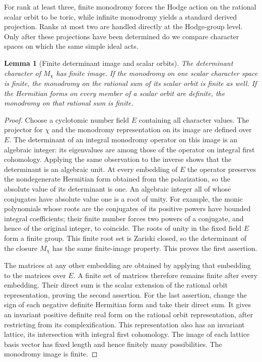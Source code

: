 \documentclass[11pt]{article}
\theoremstyle{plain}
\newtheorem{lemma}[theorem]{Lemma}
\theoremstyle{definition}
\theoremstyle{remark}
\numberwithin{equation}{section}
\begin{document}
For rank at least three, finite monodromy forces the Hodge action on the
rational scalar orbit to be toric, while infinite monodromy yields a
standard derived projection.  Ranks at most two are handled directly at the
Hodge-group level.  Only after these projections have been determined
do we compare character spaces on which the same simple ideal acts.

\begin{lemma}[Finite determinant image and scalar orbits]\label{p4:sphere-determinant-finite}
The determinant character of $M_\chi$ has finite image.  If the
monodromy on one scalar character space is finite, the monodromy on
the rational sum of its scalar orbit is finite as well.
If the Hermitian forms on every member of a scalar orbit are definite,
the monodromy on that rational sum is finite.
\end{lemma}

\begin{proof}
Choose a cyclotomic number field $E$ containing all character values.
The projector for $\chi$ and the monodromy representation on its image
are defined over $E$.  The determinant of an integral monodromy
operator on this image is an algebraic integer: its eigenvalues are
among those of the operator on integral first cohomology.  Applying
the same observation to the inverse shows that the determinant is an
algebraic unit.  At every embedding of $E$ the operator preserves the
nondegenerate Hermitian form obtained from the polarization, so the
absolute value of its determinant is one.  An algebraic integer all
of whose conjugates have absolute value one is a root of unity.
For example, the monic polynomials whose roots are the conjugates of
its positive powers have bounded integral coefficients; their finite
number forces two powers of a conjugate, and hence of the original
integer, to coincide.  The roots of unity in the fixed field $E$ form
a finite group.  This finite root set is Zariski closed, so the
determinant of the closure $M_\chi$ has the same finite-image property.
This proves the first assertion.

The matrices at any other embedding are obtained by applying that
embedding to the matrices over $E$.  A finite set of matrices therefore
remains finite after every embedding.  Their direct sum is the scalar
extension of the rational orbit representation, proving the second
assertion.  For the last assertion, change the sign of each negative
definite Hermitian form and take their direct sum.  It gives an
invariant positive definite real form on the rational orbit
representation, after restricting from its complexification.  This
representation also has an invariant lattice, its intersection with
integral first cohomology.  The image of each lattice basis vector has
fixed length and hence finitely many possibilities.  The monodromy
image is finite.
\end{proof}
\end{document}
